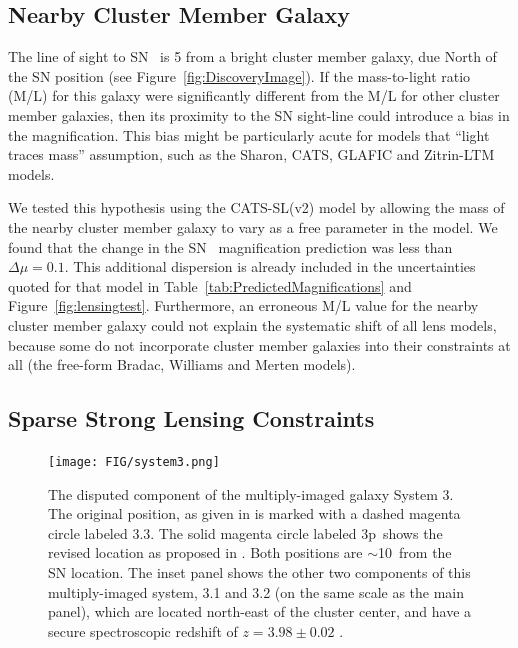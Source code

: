 \subsection{Nearby Cluster Member Galaxy}
\label{sec:NearbyClusterMemberGalaxy}

The line of sight to SN \tomas\ is 5 from a bright cluster
member galaxy, due North of the SN position (see
Figure~\ref{fig:DiscoveryImage}).  If the mass-to-light ratio (M/L)
for this galaxy were significantly different from the M/L for other
cluster member galaxies, then its proximity to the SN sight-line could
introduce a bias in the magnification.  This bias might be
particularly acute for models that  ``light traces mass'' assumption, such as the Sharon, CATS,
GLAFIC and Zitrin-LTM models.

We tested this hypothesis using the CATS-SL(v2) model by allowing the mass
of the nearby cluster member galaxy to vary as a free parameter in the
model. We found that the change in the SN \tomas\ magnification
prediction was less than $\Delta\mu=0.1$.  This additional dispersion
is already included in the uncertainties quoted for that model in
Table~\ref{tab:PredictedMagnifications} and
Figure~\ref{fig:lensingtest}.  Furthermore, an erroneous M/L
value for the nearby cluster member galaxy could not explain the
systematic shift of all lens models, because some do not incorporate
cluster member galaxies into their constraints at all (the free-form
Bradac, Williams and Merten models).

\subsection{Sparse Strong Lensing Constraints}
\label{sec:SparseStrongLensingConstraints}

\begin{figure}
\begin{center}
\texttt{[image: FIG/system3.png]}
\caption{ 
The disputed component of the multiply-imaged galaxy System 3. The
original position, as given in \citet{Merten:2011} is marked with a
dashed magenta circle labeled 3.3. The solid magenta circle
labeled \33p\ shows the revised location as proposed
in \citet{Jauzac:2014c}.  Both positions are $\sim$10\arcsec\ from the
SN location.  The inset panel shows the other two components of this
multiply-imaged system, 3.1 and 3.2 (on the same scale as the main
panel), which are located north-east of the cluster center, and have a
secure spectroscopic redshift of $z=3.98\pm0.02$ \citep{Johnson:2014}.
\label{fig:system3} }
\end{center}
\end{figure}

